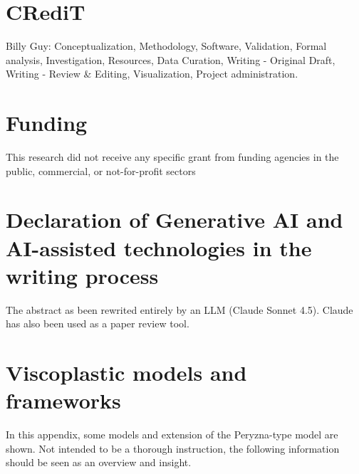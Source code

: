\documentclass[final,5p,times,twocolumn]{elsarticle}
\begin{document}
\section{CRediT}
Billy Guy: Conceptualization, Methodology, Software, Validation, Formal analysis, Investigation, Resources, Data Curation, Writing - Original Draft, Writing - Review \& Editing, Visualization, Project administration.

\section{Funding}
This research did not receive any specific grant from funding agencies in the public, commercial, or not-for-profit sectors

\section{Declaration of Generative AI and AI-assisted technologies in the writing process}
The abstract as been rewrited entirely by an LLM (Claude Sonnet 4.5). Claude has also been used as a paper review tool.


\appendix
\section{Viscoplastic models and frameworks}
\label{app:models}

In this appendix, some models and extension of the Peryzna-type model are shown. Not intended to be a thorough instruction, the following information should be seen as an overview and insight.
\end{document}
